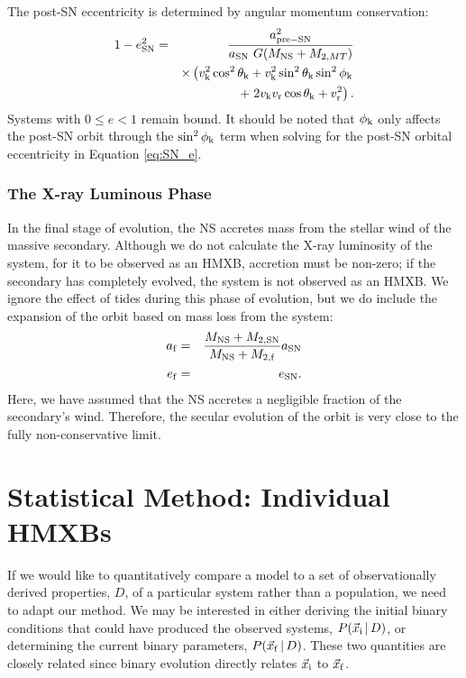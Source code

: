 \documentclass[usenatbib]{mnras}
\newcommand{\given}{\,|\,}
\begin{document}
The post-SN eccentricity is determined by angular momentum conservation:
\begin{eqnarray}
1-e_{\rm SN}^2 &=& \frac{a_{\rm pre-SN}^2}{a_{\rm SN}\ G (M_{\rm NS} + M_{2, MT})} \nonumber \\
 & & \times \left( v_{\rm k}^2 \cos^2\theta_{\rm k} + v_{\rm k}^2 \sin^2 \theta_{\rm k} \sin^2 \phi_{\rm k} \right. \nonumber \\
 & & \qquad + \left. 2 v_{\rm k} v_{\rm r} \cos \theta_{\rm k} + v_{\rm r}^2  \right). \label{eq:SN_e}
\end{eqnarray}
Systems with $0 \leq e < 1$ remain bound. It should be noted that $\phi_{\rm k}$ only affects the post-SN orbit through the $\sin^2 \phi_{\rm k}$ term when solving for the post-SN orbital eccentricity in Equation \ref{eq:SN_e}. 



\subsubsection{The X-ray Luminous Phase} \label{sec:trans_XRB}

In the final stage of evolution, the NS accretes mass from the stellar wind of the massive secondary. Although we do not calculate the X-ray luminosity of the system, for it to be observed as an HMXB, accretion must be non-zero; if the secondary has completely evolved, the system is not observed as an HMXB. We ignore the effect of tides during this phase of evolution, but we do include the expansion of the orbit based on mass loss from the system:
\begin{eqnarray}
a_{\rm f} &=& \frac{M_{\rm NS} + M_{\rm 2, SN}}{M_{\rm NS} + M_{\rm 2,f}} a_{\rm SN} \\
e_{\rm f} &=& e_{\rm SN}.
\end{eqnarray}
Here, we have assumed that the NS accretes a negligible fraction of the secondary's wind. Therefore, the secular evolution of the orbit is very close to the fully non-conservative limit.





\section{Statistical Method: Individual HMXBs} \label{sec:stats_individual}

If we would like to quantitatively compare a model to a set of observationally derived properties, $D$, of a particular system rather than a population, we need to adapt our method. We may be interested in either deriving the initial binary conditions that could have produced the observed systems, $P(\vec{x}_{\rm i} \given D)$, or determining the current binary parameters, $P(\vec{x}_{\rm f} \given D)$. These two quantities are closely related since binary evolution directly relates $\vec{x}_{\rm i}$ to $\vec{x}_{\rm f}$. 
\end{document}
